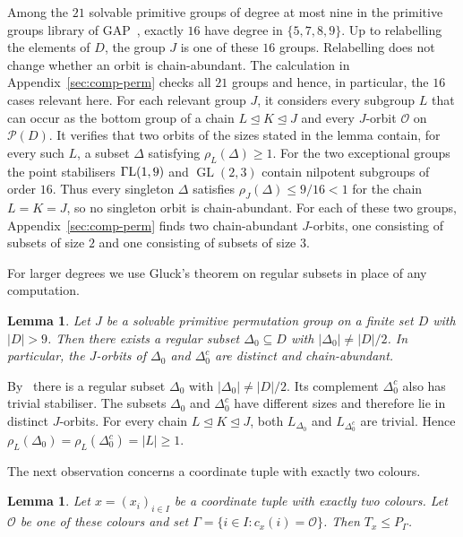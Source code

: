 \documentclass[10pt]{amsart}
\newtheorem{lemma}[theorem]{Lemma}
\theoremstyle{definition}
\renewcommand{\le}{\leqslant}
\renewcommand{\ge}{\geqslant}
\renewcommand{\leq}{\leqslant}
\renewcommand{\geq}{\geqslant}
\let\oldendproof\endproof
\renewenvironment{proof}[1][\proofname]{%
  \oldproof[\bfseries #1]%
}{\oldendproof}
\newcommand{\GammaL}{\Gamma{\rm L}}
\newcommand{\pow}{\mathcal{P}}
\newcommand{\orbit}{\mathcal{O}}
\DeclareMathOperator{\GL}{GL}
\newcommand{\GAP}{\textsf{GAP}}
\numberwithin{equation}{section}
\numberwithin{table}{section}
\begin{document}
\begin{proof}
Among the $21$ solvable primitive groups of degree at most nine in the
primitive groups library of \GAP~\cite{GAP4}, exactly $16$ have degree in
$\{5,7,8,9\}$. Up to relabelling the elements of $D$, the group $J$ is one
of these $16$ groups. Relabelling does not change whether an orbit is
chain-abundant. The calculation in Appendix~\ref{sec:comp-perm} checks all
$21$ groups and hence, in particular, the $16$ cases relevant here. For each
relevant group $J$, it considers every subgroup $L$ that
can occur as the bottom group of a chain
$L\trianglelefteq K\trianglelefteq J$ and every $J$-orbit $\orbit$ on
$\pow(D)$. It verifies that two orbits of the sizes
stated in the lemma contain, for every such $L$, a subset $\Delta$ satisfying
$\rho_L(\Delta)\geq1$. For the two exceptional groups the point
stabilisers $\GammaL(1,9)$ and $\GL(2,3)$ contain nilpotent subgroups of order
$16$. Thus every singleton $\Delta$ satisfies $\rho_J(\Delta)\le9/16<1$ for the
chain $L=K=J$, so no singleton orbit is chain-abundant. For each of these two
groups, Appendix~\ref{sec:comp-perm} finds two chain-abundant $J$-orbits, one
consisting of subsets of size $2$ and one consisting of subsets of size $3$.
\end{proof}

For larger degrees we use Gluck's theorem on regular subsets in place of any
computation.

\begin{lemma}\label{lem:large}
Let $J$ be a solvable primitive permutation group on a finite set $D$ with
$|D|>9$. Then there exists a regular subset $\Delta_0\subseteq D$ with
$|\Delta_0|\ne|D|/2$. In particular, the $J$-orbits of $\Delta_0$ and
$\Delta_0^c$ are distinct and chain-abundant.
\end{lemma}

\begin{proof}
By~\cite[Theorem~1]{Glu83} there is a regular subset $\Delta_0$ with
$|\Delta_0|\ne|D|/2$. Its complement $\Delta_0^{c}$ also has
trivial stabiliser. The subsets $\Delta_0$ and $\Delta_0^c$ have different
sizes and therefore lie in distinct $J$-orbits. For every chain
$L\trianglelefteq K\trianglelefteq J$, both $L_{\Delta_0}$ and
$L_{\Delta_0^c}$ are trivial. Hence
$\rho_L(\Delta_0)=\rho_L(\Delta_0^c)=|L|\ge1$.
\end{proof}

The next observation concerns a coordinate tuple with exactly two colours.

\begin{lemma}\label{lem:fine-label}
Let $x=(x_i)_{i\in I}$ be a coordinate tuple with exactly two colours. Let
$\mathcal O$ be one of these colours and set
$\Gamma=\{i\in I:c_x(i)=\mathcal O\}$. Then $T_x\leq P_\Gamma$.
\end{lemma}
\end{document}
